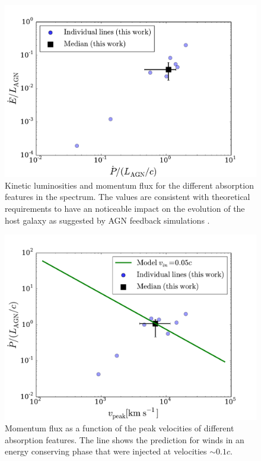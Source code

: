 \documentclass{report}
\begin{document}
\begin{figure}
\begin{center}
\includegraphics[width=0.9\linewidth,angle=0]{ep_ratio.pdf}
\caption{Kinetic luminosities and momentum flux for the different
  absorption features in the spectrum. The values are consistent with
  theoretical requirements to have an noticeable impact on the
  evolution of the host galaxy as suggested by AGN feedback
  simulations . \label{fig:ep_values}} 
\end{center}
\end{figure}

\begin{figure}
\begin{center}
\includegraphics[width=0.9\linewidth,angle=0]{p_ratio_theory.pdf}
\caption{Momentum flux as a function of the peak velocities of
  different absorption features. The line shows the prediction for
  winds in an energy conserving phase that were injected at
  velocities $\sim 0.1c$. \label{fig:p_ratio}}
\end{center}
\end{figure}





 
\end{document}
